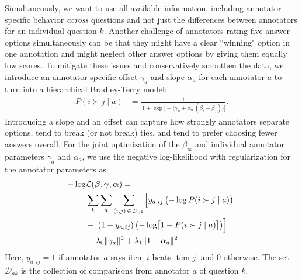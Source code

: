 Simultaneously, we want to use all available information, including annotator-specific behavior \textit{across} questions and not just the differences between annotators for an individual question $k$.
Another challenge of annotators rating five answer options simultaneously can be that they might have a clear ``winning" option in one annotation and might neglect other answer options by giving them equally low scores.
To mitigate these issues and conservatively smoothen the data, we introduce an annotator-specific offset $\gamma_a$ and slope $\alpha_a$ for each annotator $a$ to turn  into a hierarchical Bradley-Terry model:
%
\begin{align}
    P(i \succ j \mid a) 
    &= \frac{1}{\,1 + \exp\bigl[-\bigl(\gamma_a + \alpha_a \,(\beta_i - \beta_j)\bigr)\bigr]}.
    \label{eq:hbt-prob}
\end{align}
%
Introducing a slope and an offset can capture how strongly annotators separate options, tend to break (or not break) ties, and tend to prefer choosing fewer answers overall.
For the joint optimization of the $\beta_{ik}$ and individual annotator parameters $\gamma_a$ and $\alpha_a$, we use the negative log-likelihood with regularization for the annotator parameters as
%
\begin{align}
    \begin{split}
    -\log &\mathcal{L}(\boldsymbol{\beta}, \boldsymbol{\gamma}, \boldsymbol{\alpha}) 
    = 
    \\& \sum_{k}\sum_{a}
    \sum_{(i,j)\,\in\,\mathcal{D}_{ak}}
    \Bigl[
    y_{a,ij}\,\bigl(-\log P(i \succ j \mid a)\bigr)
    \;\\&+\;
    (1 - y_{a,ij})\,\bigl(-\log \bigl[1 - P(i \succ j \mid a)\bigr]\bigr)\Bigr]
     \\& + \lambda_0 \|\gamma_a\|^2 + \lambda_1 \|1 - \alpha_a\|^2.
    \end{split}
    \label{eq:hbt-nll}
\end{align}
%
Here, $y_{a,ij} = 1$ if annotator $a$ says item $i$ beats item $j$, and $0$ otherwise. 
The set $\mathcal{D}_{ak}$ is the collection of comparisons from annotator $a$ of question $k$.

